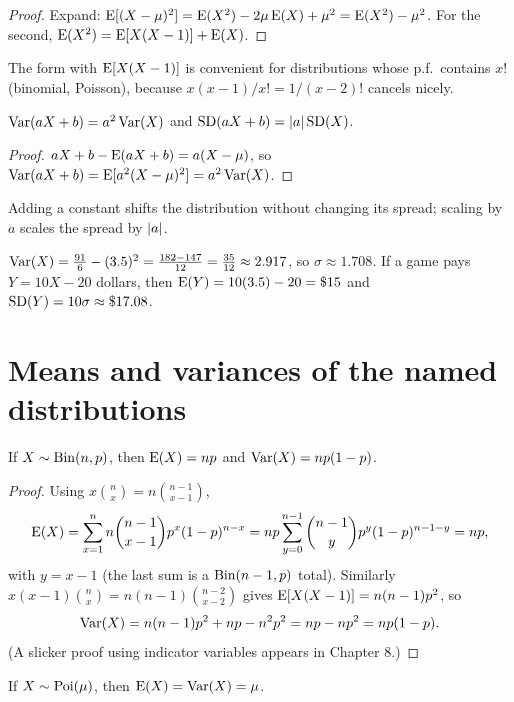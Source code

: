 \begin{proof}
Expand: $\operatorname{E}[(X-\mu)^2] = \operatorname{E}(X^2) - 2\mu\operatorname{E}(X) + \mu^2 = \operatorname{E}(X^2) - \mu^2$. For the second,
$\operatorname{E}(X^2) = \operatorname{E}[X(X-1)] + \operatorname{E}(X)$.
\end{proof}

The form with $\operatorname{E}[X(X-1)]$ is convenient for distributions whose p.f.\ contains $x!$
(binomial, Poisson), because $x(x-1)/x! = 1/(x-2)!$ cancels nicely.

\begin{theorem}
$\operatorname{Var}(aX+b) = a^2\operatorname{Var}(X)$ and $\operatorname{SD}(aX+b) = \left\lvert a \right\rvert\operatorname{SD}(X)$.
\end{theorem}

\begin{proof}
$aX + b - \operatorname{E}(aX+b) = a(X - \mu)$, so $\operatorname{Var}(aX+b) = \operatorname{E}[a^2(X-\mu)^2] = a^2\operatorname{Var}(X)$.
\end{proof}

Adding a constant shifts the distribution without changing its spread; scaling by $a$
scales the spread by $\left\lvert a \right\rvert$.

\begin{example}
$\operatorname{Var}(X) = \frac{91}{6} - (3.5)^2 = \frac{182 - 147}{12} = \frac{35}{12} \approx 2.917$, so
$\sigma \approx 1.708$. If a game pays $Y = 10X - 20$ dollars, then
$\operatorname{E}(Y) = 10(3.5) - 20 = \$15$ and $\operatorname{SD}(Y) = 10\sigma \approx \$17.08$.
\end{example}

\section{Means and variances of the named distributions}

\begin{theorem}[Binomial]
If $X\sim\operatorname{Bin}(n,p)$, then $\operatorname{E}(X) = np$ and $\operatorname{Var}(X) = np(1-p)$.
\end{theorem}

\begin{proof}
Using $x\binom nx = n\binom{n-1}{x-1}$,
\[
  \operatorname{E}(X) = \sum_{x=1}^n n\binom{n-1}{x-1}p^x(1-p)^{n-x}
  = np\sum_{y=0}^{n-1}\binom{n-1}{y}p^y(1-p)^{n-1-y} = np,
\]
with $y = x - 1$ (the last sum is a $\operatorname{Bin}(n-1,p)$ total). Similarly
$x(x-1)\binom nx = n(n-1)\binom{n-2}{x-2}$ gives $\operatorname{E}[X(X-1)] = n(n-1)p^2$, so
\[
  \operatorname{Var}(X) = n(n-1)p^2 + np - n^2p^2 = np - np^2 = np(1-p).
\]
(A slicker proof using indicator variables appears in Chapter 8.)
\end{proof}

\begin{theorem}[Poisson]
If $X\sim\operatorname{Poi}(\mu)$, then $\operatorname{E}(X) = \operatorname{Var}(X) = \mu$.
\end{theorem}

